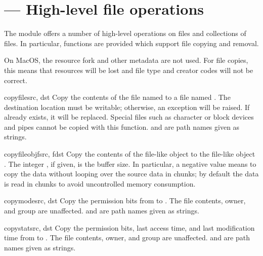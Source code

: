 \section{ ---
         High-level file operations}



The  module offers a number of high-level operations on
files and collections of files.  In particular, functions are provided 
which support file copying and removal.

  On MacOS, the resource fork and other metadata are
not used.  For file copies, this means that resources will be lost and 
file type and creator codes will not be correct.


\begin{funcdesc}{copyfile}{src, dst}
  Copy the contents of the file named  to a file named
  .  The destination location must be writable; otherwise, 
  an  exception will be raised.
  If  already exists, it will be replaced.  
  Special files such as character or block devices
  and pipes cannot be copied with this function.   and
   are path names given as strings.
\end{funcdesc}

\begin{funcdesc}{copyfileobj}{fsrc, fdst}
  Copy the contents of the file-like object  to the
  file-like object .  The integer , if given,
  is the buffer size. In particular, a negative  value
  means to copy the data without looping over the source data in
  chunks; by default the data is read in chunks to avoid uncontrolled
  memory consumption.
\end{funcdesc}

\begin{funcdesc}{copymode}{src, dst}
  Copy the permission bits from  to .  The file
  contents, owner, and group are unaffected.   and 
  are path names given as strings.
\end{funcdesc}

\begin{funcdesc}{copystat}{src, dst}
  Copy the permission bits, last access time, and last modification
  time from  to .  The file contents, owner, and
  group are unaffected.   and  are path names given
  as strings.
\end{funcdesc}

